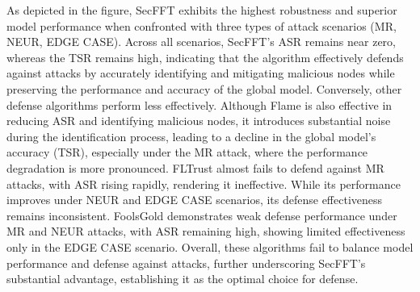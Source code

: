 \documentclass[lettersize,journal]{IEEEtran}
\begin{document}
As depicted in the figure, SecFFT exhibits the highest robustness and superior model performance when confronted with three types of attack scenarios (MR, NEUR, EDGE CASE). Across all scenarios, SecFFT's ASR remains near zero, whereas the TSR remains high, indicating that the algorithm effectively defends against attacks by accurately identifying and mitigating malicious nodes while preserving the performance and accuracy of the global model. Conversely, other defense algorithms perform less effectively. Although Flame is also effective in reducing ASR and identifying malicious nodes, it introduces substantial noise during the identification process, leading to a decline in the global model's accuracy (TSR), especially under the MR attack, where the performance degradation is more pronounced. FLTrust almost fails to defend against MR attacks, with ASR rising rapidly, rendering it ineffective. While its performance improves under NEUR and EDGE CASE scenarios, its defense effectiveness remains inconsistent. FoolsGold demonstrates weak defense performance under MR and NEUR attacks, with ASR remaining high, showing limited effectiveness only in the EDGE CASE scenario. Overall, these algorithms fail to balance model performance and defense against attacks, further underscoring SecFFT's substantial advantage, establishing it as the optimal choice for defense.
\end{document}
